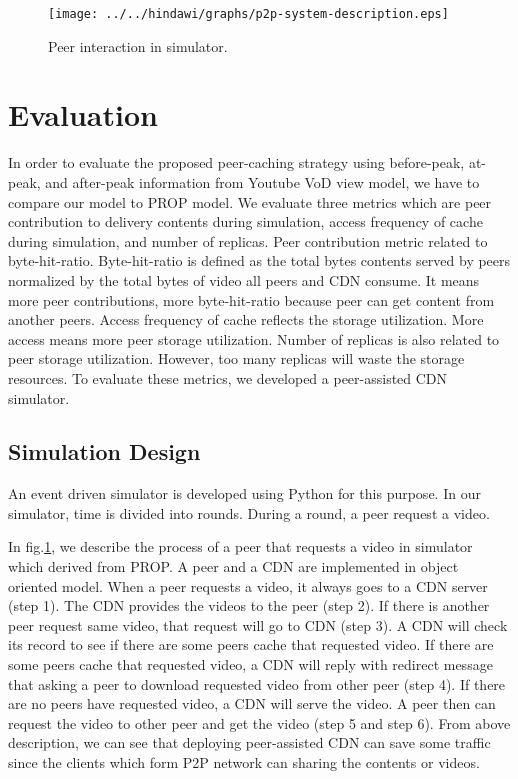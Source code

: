 \begin{figure}[!t]
\begin{center}
\texttt{[image: ../../hindawi/graphs/p2p-system-description.eps]}
\end{center}
\caption{Peer interaction in simulator.}
\label{fig:p2pcdninteractioninsimulator}
\end{figure} 



\section{Evaluation}\label{evaluation}

In order to evaluate the proposed peer-caching strategy using before-peak, at-peak, and after-peak information from Youtube VoD view model, we have to compare our model to PROP model.
We evaluate three metrics which are peer contribution to delivery contents during simulation,  access frequency of cache during simulation, and number of replicas. 
Peer contribution metric related to byte-hit-ratio. 
Byte-hit-ratio is defined as the total bytes contents served by peers normalized by the total bytes of video all peers and CDN consume.
It means more peer contributions, more byte-hit-ratio because peer can get content from another peers. 
Access frequency of cache reflects the storage utilization. 
More access means more peer storage utilization.  
Number of replicas is also related to peer storage utilization.  
However, too many replicas will waste the storage resources.
To evaluate these metrics, we developed a peer-assisted CDN simulator. 


\subsection{Simulation Design}\label{simulationdesign}
An event driven simulator is developed using Python for this purpose.
In our simulator, time is divided into rounds. 
During a round, a peer request a video.

In fig.\ref{fig:p2pcdninteractioninsimulator}, we describe the process of a peer that requests a video in simulator which derived from PROP.
A peer and a CDN are implemented in object oriented model. 
When a peer requests a video, it always goes to a CDN server (step 1). 
The CDN provides the videos to the peer (step 2). 
If there is another peer request same video, that request will go to CDN (step 3).  
A CDN will check its record to see if there are some peers cache that requested video.  
If there are some peers cache that requested video, a CDN will reply with redirect message that asking a peer to download requested video from other peer (step 4).
If there are no peers have requested video, a CDN will serve the video.   
A peer then can request the video to other peer and get the video (step 5 and step 6).
From above description, we can see that deploying peer-assisted CDN can save some traffic since the clients which form P2P network can sharing the contents or videos.


